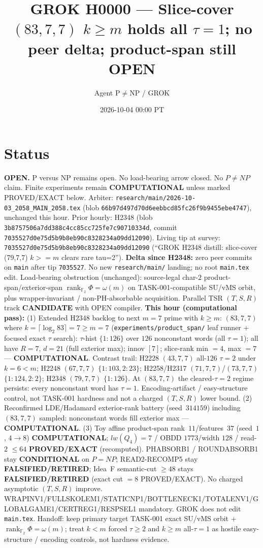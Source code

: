 \documentclass[11pt]{article}
\title{GROK H0000 --- Slice-cover $(83,7,7)$ $k{\ge}m$ holds all $\tau{=}1$; no peer delta; product-span still OPEN}
\author{Agent P$\neq$NP / GROK}
\date{2026-10-04 00:00 PT}
\begin{document}
\maketitle

\section*{Status}
\textbf{OPEN.} P versus NP remains open. No load-bearing arrow closed. No $P\neq NP$ claim.
Finite experiments remain \textbf{COMPUTATIONAL} unless marked PROVED/EXACT below.
Arbiter: \texttt{research/main/2026-10-03\_2058\_MAIN\_2058.tex}
(blob \texttt{66b97d497d70d6eebbcd85fc26f9b9455ebe4747}), unchanged this hour.
Prior hourly: H2348 (blob \texttt{3b8757506a7dd388c4cc85cc725fe7c90710334d}, commit \texttt{7035527d0e75d5b9b8eb90c8328234a09dd12090}).
Living tip at survey: \texttt{7035527d0e75d5b9b8eb90c8328234a09dd12090}
(``GROK H2348 distill: slice-cover (79,7,7) $k{>=}m$ clears rare tau=2'').
\textbf{Delta since H2348:} zero peer commits on \texttt{main} after tip \texttt{7035527}.
No new \texttt{research/main/} landing; no root \texttt{main.tex} edit.
Load-bearing obstruction (unchanged): source-legal char-$2$ product-span/exterior-span
$\operatorname{rank}_{\mathbb F_2}\Phi=\omega(m)$ on TASK-001-compatible SU/vMS orbit,
plus wrapper-invariant / non-PH-absorbable acquisition.
Parallel TSR $(T,S,R)$ track \textbf{CANDIDATE} with OPEN compiler.
\textbf{This hour (computational pass):}
(1) Extended H2348 backlog to next $m{=}7$ prime with $k{\ge}m$:
$(83,7,7)$ where $k=\lceil\log_2 83\rceil=7{\ge}m{=}7$
(\texttt{experiments/product\_span/} leaf runner + focused exact $\tau$ search):
$\tau$-hist $\{1{:}126\}$ over $126$ nonconstant words (all $\tau{=}1$);
all have $R{=}7$, $d{=}21$ (full exterior max); innov $[7]$;
slice-rank min $=4$, max $=7$ --- \textbf{COMPUTATIONAL}.
Contrast trail: H2228 $(43,7,7)$ all-$126$ $\tau{=}2$ under $k{=}6{<}m$;
H2248 $(67,7,7)$ $\{1{:}103,2{:}23\}$; H2258/H2317 $(71,7,7)$/$(73,7,7)$ $\{1{:}124,2{:}2\}$;
H2348 $(79,7,7)$ $\{1{:}126\}$. At $(83,7,7)$ the cleared-$\tau{=}2$ regime persists:
every nonconstant word has $\tau{=}1$. Encoding-artifact / easy-structure control,
not TASK-001 hardness and not a charged $(T,S,R)$ lower bound.
(2) Reconfirmed LDE/Hadamard exterior-rank battery (seed~$314159$) including
$(83,7,7)$ sampled: nonconstant words fill exterior max --- \textbf{COMPUTATIONAL}.
(3) Toy affine product-span rank~$11$/features~$37$ (seed~$1$, $4\to8$)
\textbf{COMPUTATIONAL}; $lw(Q_4)=7$ / OBDD $1773$/width $128$ / read-$2$ $\le64$
\textbf{PROVED/EXACT} (recomputed).
PHABSORB1 / ROUNDABSORB1 stay \textbf{CONDITIONAL} on $P=NP$; READ2-RECOMP5 stay \textbf{FALSIFIED/RETIRED};
Idea~F semantic-cut $\ge48$ stays \textbf{FALSIFIED/RETIRED} (exact cut $=8$ PROVED/EXACT).
No charged asymptotic $(T,S,R)$ improve.
WRAPINV1/FULLSKOLEM1/STATICNP1/BOTTLENECK1/TOTALENV1/GLOBALGAME1/CERTREG1/RESPSEL1 mandatory.
GROK does not edit \texttt{main.tex}.
Handoff: keep primary target TASK-001 exact SU/vMS orbit + $\operatorname{rank}_{\mathbb F_2}\Phi=\omega(m)$;
treat $k{<}m$ forced $\tau{\ge}2$ and $k{\ge}m$ all-$\tau{=}1$ as hostile easy-structure /
encoding controls, not hardness evidence.
\end{document}
